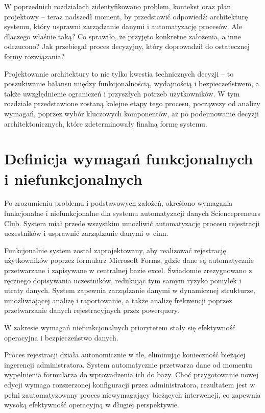 W poprzednich rozdziałach zidentyfikowano problem, kontekst oraz plan projektowy – teraz nadszedł moment, by przedstawić odpowiedź: architekturę systemu, który usprawni zarządzanie danymi i automatyzację procesów. Ale dlaczego właśnie taką? Co sprawiło, że przyjęto konkretne założenia, a inne odrzucono? Jak przebiegał proces decyzyjny, który doprowadził do ostatecznej formy rozwiązania?

Projektowanie architektury to nie tylko kwestia technicznych decyzji – to poszukiwanie balansu między funkcjonalnością, wydajnością i bezpieczeństwem, a także uwzględnienie ograniczeń i przyszłych potrzeb użytkowników. W tym rozdziale przedstawione zostaną kolejne etapy tego procesu, począwszy od analizy wymagań, poprzez wybór kluczowych komponentów, aż po podejmowanie decyzji architektonicznych, które zdeterminowały finalną formę systemu.

\section{Definicja wymagań funkcjonalnych i niefunkcjonalnych}
Po zrozumieniu problemu i podstawowych założeń, określono wymagania funkcjonalne i niefunkcjonalne dla systemu automatyzacji danych Sciencepreneurs Club. System miał przede wszystkim umożliwić automatyzację procesu rejestracji uczestników i usprawnić zarządzanie danymi w \gls{cinn}.

Funkcjonalnie system został zaprojektowany, aby realizować rejestrację użytkowników poprzez formularz Microsoft Forms, gdzie dane są automatycznie przetwarzane i zapisywane w centralnej bazie \gls{excel}. Świadomie zrezygnowano z ręcznego dopisywania uczestników, redukując tym samym ryzyko pomyłek i utraty danych. System zapewnia zarządzanie danymi w dynamicznej strukturze, umożliwiającej analizę i raportowanie, a także analizę frekwencji poprzez przetwarzanie danych rejestracyjnych przez \gls{powerquery}.

W zakresie wymagań niefunkcjonalnych priorytetem stały się efektywność operacyjna i bezpieczeństwo danych.

Proces rejestracji działa autonomicznie w tle, eliminując konieczność bieżącej ingerencji administratora. System automatycznie przetwarza dane od momentu wypełnienia formularza do wprowadzenia ich do bazy. Choć przygotowanie nowej edycji wymaga rozszerzonej konfiguracji przez administratora, rezultatem jest w pełni zautomatyzowany proces niewymagający bieżących interwencji, co zapewnia wysoką efektywność operacyjną w długiej perspektywie.

